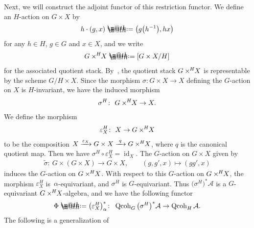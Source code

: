 \documentclass[10pt,a4paper]{amsart}
\makeatletter
\newcommand*{\defeq}{\mathrel{\rlap{%
 \raisebox{0.3ex}{$\m@th\cdot$}}%
 \raisebox{-0.3ex}{$\m@th\cdot$}}%
 =}
\numberwithin{equation}{section}
\newcommand{\Qcoh}{\operatorname{Qcoh}}
\newcommand{\id}{\operatorname{id}}
\newcommand{\cA}{\mathcal{A}}
\newcommand{\timesH}{\times^{\hspace{-0.2mm}H\hspace{0.2mm}}\!\!}
\makeatother
\begin{document}
Next, we will construct the adjoint functor of this restriction functor. We define an $H$-action on $G\times X$ by
\begin{gather*}
h\cdot(g,x)\defeq\big(g\big(h^{-1}\big), h x\big)
\end{gather*}
for any $h\in H$, $g\in G$ and $x\in X$, and we write
\begin{gather*}
G\timesH X\defeq[G\times X/H]
\end{gather*}
for the associated quotient stack. By~\cite[Lemma~2.16(a)]{bfk}, the quotient stack $G\timesH X$ is representable by the scheme $G/H\times X$.
Since the morphism $\sigma\colon G\times X\to X$ defining the $G$-action on $X$ is $H$-invariant, we have the induced morphism
\begin{gather*}
\sigma^H\colon\ G\timesH X\to X.
\end{gather*}
We define the morphism
\begin{gather*}
\varepsilon_X^H\colon\ X\to G\timesH X
\end{gather*}
to be the composition $X\xrightarrow{\varepsilon_X}G\times X\xrightarrow{\,\,q\,\,}G\timesH X$,
where $q$ is the canonical quotient map. Then we have $\sigma^{H}\circ\varepsilon_X^H=\id_X$. The $G$-action on $G\times X$ given by
\begin{gather}\label{3b}
\widetilde{\sigma}\colon\ G\times (G\times X)\to G\times X,\qquad
(g,g',x)\mapsto (gg',x)
\end{gather}
induces the $G$-action on $G\timesH X$. With respect to this $G$-action on $G\timesH X$, the morphism $\varepsilon_X^H$ is~$\alpha$-equivariant, and $\sigma^H$ is $G$-equivariant. Thus $\big(\sigma^H\big)^*\cA$ is a $G$-equivariant $G\timesH X$-algebra, and we have the following functor
\begin{gather*}
\Phi\defeq\big(\varepsilon_X^H\big)^*_{\alpha}\colon\ \Qcoh _G\big(\sigma^H\big)^*\cA\to \Qcoh_H\cA.
\end{gather*}
The following is a generalization of~\cite[Lemma~2.13]{bfk}
\end{document}
